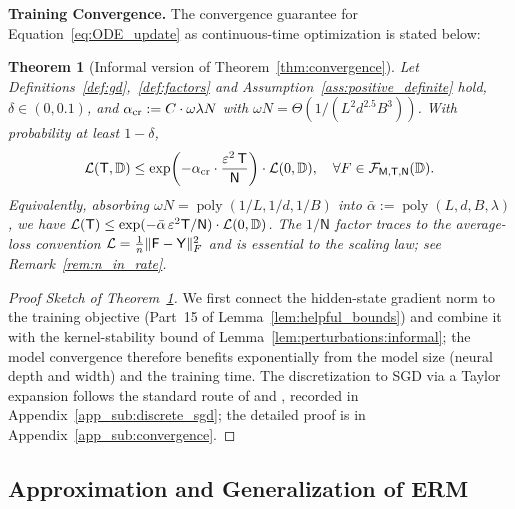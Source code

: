 \documentclass[11pt]{article}
\let\citet\citep
\theoremstyle{plain}
\newtheorem{theorem}{Theorem}[section]
\DeclareMathOperator{\poly}{poly}
\begin{document}
{\bf Training Convergence.} The convergence guarantee for Equation~\eqref{eq:ODE_update} as continuous-time optimization is stated below:
\begin{theorem}[Informal version of Theorem~\ref{thm:convergence}]\label{thm:convergence:informal}
    Let Definitions~\ref{def:gd},~\ref{def:factors} and Assumption~\ref{ass:positive_definite} hold, $\delta\in(0, 0.1)$, and $\alpha_{\rm cr}:=C\cdot\omega\lambda N$ with $\omega N=\Theta(1/(L^2 d^{2.5}B^3))$. With probability at least $1-\delta$,
    \begin{align*}
        {\cal L}({\sf T},\mathbb{D}) \le \exp\!\left(-\alpha_{\rm cr}\cdot \frac{\varepsilon^2\, {\sf T}}{\mathsf{N}}\right)\cdot {\cal L}(0,\mathbb{D}),\quad \forall F\in{\cal F}_{\sf M,T,N}(\mathbb{D}).
    \end{align*}
    Equivalently, absorbing $\omega N=\poly(1/L,1/d,1/B)$ into $\bar\alpha:=\poly(L,d,B,\lambda)$, we have ${\cal L}({\sf T})\le \exp(-\bar\alpha\,\varepsilon^2{\sf T}/\mathsf{N})\cdot{\cal L}(0, \mathbb{D})$. The $1/\mathsf{N}$ factor traces to the average-loss convention ${\cal L} = \frac{1}{n}\|{\sf F}-{\sf Y}\|_F^2$ and is essential to the scaling law; see Remark~\ref{rem:n_in_rate}.
\end{theorem}
\begin{proof}[Proof Sketch of Theorem~\ref{thm:convergence:informal}]
    We first connect the hidden-state gradient norm to the training objective (Part~15 of Lemma~\ref{lem:helpful_bounds}) and combine it with the kernel-stability bound of Lemma~\ref{lem:perturbations:informal}; the model convergence therefore benefits exponentially from the model size (neural depth and width) and the training time. The discretization to SGD via a Taylor expansion follows the standard route of \citet{dzps19} and \citet{lssy25}, recorded in Appendix~\ref{app_sub:discrete_sgd}; the detailed proof is in Appendix~\ref{app_sub:convergence}.
\end{proof}

\subsection{Approximation and Generalization of ERM}\label{sub:approx}
\end{document}
